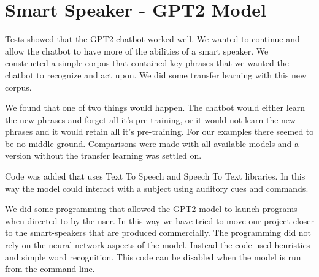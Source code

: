 \section{Smart Speaker - GPT2 Model}
Tests showed that the GPT2 chatbot worked well. We wanted to continue and allow the chatbot to
have more of the abilities of a smart speaker. We constructed a simple corpus that contained
key phrases that we wanted the chatbot to recognize and act upon. We did some transfer learning
with this new corpus.

We found that one of two things would happen. The chatbot would either learn the new phrases and forget all it's pre-training, or it would not learn the new phrases and it would retain all it's 
pre-training. For our examples there seemed to be no middle ground. Comparisons were made with 
all available models and a version without the transfer learning was settled on.

Code was added that uses Text To Speech and Speech To Text libraries. In this way the model could
interact with a subject using auditory cues and commands.

We did some programming that allowed the GPT2 model to launch programs when directed to by
the user. In this way we have tried to move our project closer to the smart-speakers that
are produced commercially. The programming did not rely on the neural-network aspects of the
model. Instead the code used heuristics and simple word recognition. This code can be disabled
when the model is run from the command line.


